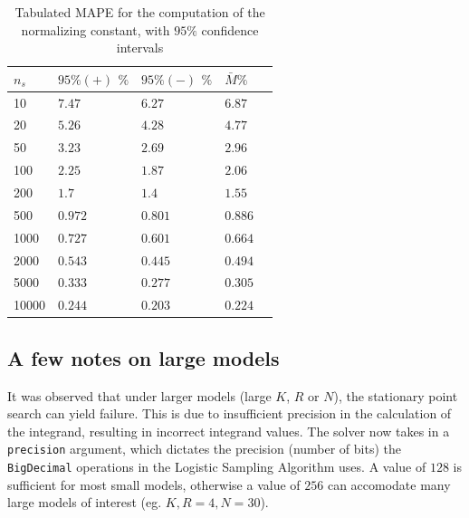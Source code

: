 \begin{table}[!htb] 
\begin{center}
\begin{tabular}{@{}lllll@{}}
\toprule
    \(n_s\) & \(95\% (+)\) \(\%\) & \(95\% (-)\) \(\%\) & \(\bar{M} \%\) &  \\  \midrule
    10 &\(7.47\) & \(6.27\) & \(6.87\) &  \\ 
    20 &\(5.26\) & \(4.28\) & \(4.77\) &  \\ 
    50 &\(3.23\) & \(2.69\) & \(2.96\) &  \\ 
    100 &\(2.25\) & \(1.87\) & \(2.06\) &  \\ 
    200 &\(1.7\) & \(1.4\) & \(1.55\) &  \\ 
    500 &\(0.972\) & \(0.801\) & \(0.886\) &  \\ 
    1000 &\(0.727\) & \(0.601\) & \(0.664\) &  \\ 
    2000 &\(0.543\) & \(0.445\) & \(0.494\) &  \\ 
    5000 &\(0.333\) & \(0.277\) & \(0.305\) &  \\ 
    10000 &\(0.244\) & \(0.203\) & \(0.224\) &  \\  \bottomrule
\end{tabular}
\end{center}
\caption{Tabulated MAPE for the computation of the normalizing constant, with \(95\%\) confidence intervals}
\label{tab:convergence_error_MS_NC}
\end{table}


\subsection{A few notes on large models}
It was observed that under larger models (large \(K\), \(R\) or \(N\)), the stationary point search can yield failure. This is due to insufficient precision in the calculation of the integrand, resulting in incorrect integrand values. The solver now takes in a \texttt{precision} argument, which dictates the precision (number of bits) the \texttt{BigDecimal} operations in the Logistic Sampling Algorithm uses. A value of \(128\) is sufficient for most small models, otherwise a value of \(256\) can accomodate many large models of interest (eg. \(K,R = 4, N=30 \)).